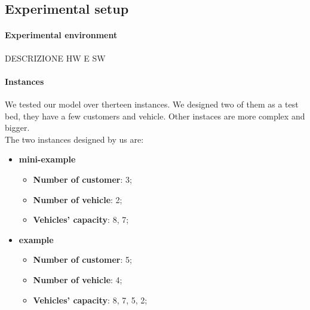 \documentclass[main.tex]{subfiles}
\begin{document}
\subsection{Experimental setup}
\paragraph{Experimental environment}
DESCRIZIONE HW E SW

\paragraph{Instances}
We tested our model over therteen instances. We designed two of them as a test bed, they have a few customers and vehicle. Other instaces are more complex and bigger.\\
The two instances designed by us are:
\begin{itemize}
    \item \textbf{mini-example}
        \begin{itemize}
            \item \textbf{Number of customer}: 3;
            \item \textbf{Number of vehicle}: 2;
            \item \textbf{Vehicles' capacity}: 8, 7;
        \end{itemize}

    \item \textbf{example}
        \begin{itemize}
            \item \textbf{Number of customer}: 5;
            \item \textbf{Number of vehicle}: 4;
            \item \textbf{Vehicles' capacity}: 8, 7, 5, 2;
        \end{itemize}
\end{itemize}
\end{document}
